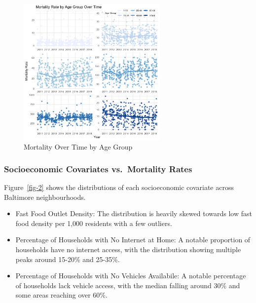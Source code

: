\documentclass[
  letterpaper,
  DIV=11,
  numbers=noendperiod]{scrartcl}
\begin{document}
\begin{figure}

{\centering \includegraphics[width=0.65\textwidth,height=\textheight]{figures/mortality_over_time_by_age_group.png}

}

\caption{\label{fig-1}Mortality Over Time by Age Group}

\end{figure}

\hypertarget{socioeconomic-covariates-vs.-mortality-rates}{%
\subsubsection{Socioeconomic Covariates vs.~Mortality
Rates}\label{socioeconomic-covariates-vs.-mortality-rates}}

Figure~\ref{fig-2} shows the distributions of each socioeconomic
covariate across Baltimore neighbourhoods.

\begin{itemize}
\item
  Fast Food Outlet Density: The distribution is heavily skewed towards
  low fast food density per 1,000 residents with a few outliers.
\item
  Percentage of Households with No Internet at Home: A notable
  proportion of households have no internet access, with the
  distribution showing multiple peaks around 15-20\% and 25-35\%.
\item
  Percentage of Households with No Vehicles Availabile: A notable
  percentage of households lack vehicle access, with the median falling
  around 30\% and some areas reaching over 60\%.
\end{itemize}
\end{document}
